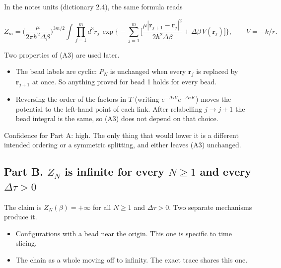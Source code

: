 \documentclass[11pt,a4paper]{article}
\newcommand{\tagmark}[1]{\marginnote{\scriptsize\ttfamily #1}}
\providecommand{\tightlist}{\setlength{\itemsep}{0pt}\setlength{\parskip}{0pt}}
\begin{document}
\tagmark{[D]} In the notes\textquotesingle{} units (dictionary 2.4), the same formula reads

\begin{equation}
Z_m=\Big(\frac{\mu}{2\pi\hbar^2\Delta\beta}\Big)^{3m/2}\int\prod_{j=1}^m d^3r_j\,\exp\Big\{-\sum_{j=1}^m\Big[\frac{\mu|\mathbf r_{j+1}-\mathbf r_j|^2}{2\hbar^2\Delta\beta}+\Delta\beta\,V(\mathbf r_j)\Big]\Big\},\qquad V=-k/r.\tag{A4}
\end{equation}

Two properties of (A3) are used later.

\begin{itemize}
\tightlist
\item
  The bead labels are cyclic: \(P_N\) is unchanged when every \(\mathbf r_j\) is replaced by \(\mathbf r_{j+1}\) at once. So anything proved for bead 1 holds for every bead.
\item
  Reversing the order of the factors in \(T\) (writing \(e^{-\Delta\tau V}e^{-\Delta\tau K}\)) moves the potential to the left-hand point of each link. After relabelling \(j\to j+1\) the bead integral is the same, so (A3) does not depend on that choice.
\end{itemize}

Confidence for Part A: high. The only thing that would lower it is a different intended ordering or a symmetric splitting, and either leaves (A3) unchanged.

\hypertarget{part-b.-z_n-is-infinite-for-every-nge1-and-every-deltatau0}{%
\subsection{\texorpdfstring{Part B. \(Z_N\) is infinite for every \(N\ge1\) and every \(\Delta\tau>0\)}{Part B. Z\_N is infinite for every N\textbackslash ge1 and every \textbackslash Delta\textbackslash tau\textgreater0}}\label{part-b.-z_n-is-infinite-for-every-nge1-and-every-deltatau0}}

The claim is \(Z_N(\beta)=+\infty\) for all \(N\ge1\) and \(\Delta\tau>0\). Two separate mechanisms produce it.

\begin{itemize}
\tightlist
\item
  Configurations with a bead near the origin. This one is specific to time slicing.
\item
  The chain as a whole moving off to infinity. The exact trace shares this one.
\end{itemize}
\end{document}
